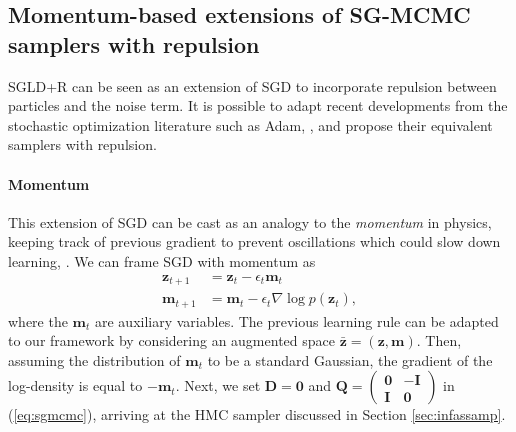 \subsection{Momentum-based extensions of SG-MCMC samplers with repulsion}\label{sec:momentum}

SGLD+R can be seen as an extension of SGD to incorporate repulsion between particles and the noise term. It is possible to adapt recent developments from the stochastic optimization literature such as Adam, \cite{kingma2014adam}, and propose their equivalent samplers with repulsion.



\paragraph{Momentum} This extension of SGD can be cast as an analogy to the \emph{momentum} in physics, keeping track of previous gradient to prevent oscillations which could slow down learning, \cite{qian1999momentum}. We can frame SGD with momentum as
\begin{align*}
    \bm{z}_{t+1} &= \bm{z}_t - \epsilon_t \bm{m}_t \\
    \bm{m}_{t+1} &= \bm{m}_t - \epsilon_t \nabla \log p(\bm{z}_t),
\end{align*}
where the $\bm{m}_t$ are auxiliary variables.
The previous learning rule can be adapted to our framework by considering an augmented space $\bar{\bm{z}} = (\bm{z}, \bm{m})$. Then, assuming the distribution of $\bm{m}_t$ to be a standard Gaussian, the gradient of the log-density is equal to $-\bm{m}_t$. Next, we set $\mathbf{D} = \mathbf{0}$ and $\mathbf{Q} = \begin{pmatrix}
\mathbf{0} & -\mathbf{I} \\
\mathbf{I} & \mathbf{0}
\end{pmatrix}$ in (\ref{eq:sgmcmc}), arriving at the HMC sampler discussed in Section \ref{sec:infassamp}. 

